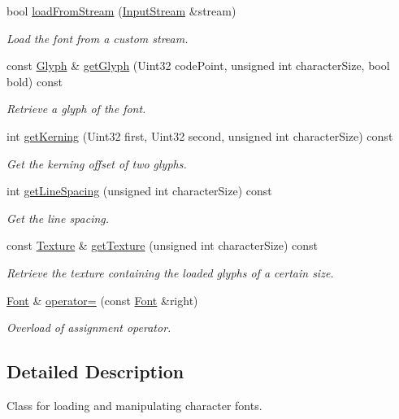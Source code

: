 \begin{DoxyCompactItemize}
bool \hyperlink{classsf_1_1_font_abc3f37a354ce8b9a21f8eb93bd9fdafb}{load\+From\+Stream} (\hyperlink{classsf_1_1_input_stream}{Input\+Stream} \&stream)
\begin{DoxyCompactList}\small\item\em Load the font from a custom stream. \end{DoxyCompactList}\item 
const \hyperlink{classsf_1_1_glyph}{Glyph} \& \hyperlink{classsf_1_1_font_a148eb92890113052f12f8a231ad619b9}{get\+Glyph} (Uint32 code\+Point, unsigned int character\+Size, bool bold) const 
\begin{DoxyCompactList}\small\item\em Retrieve a glyph of the font. \end{DoxyCompactList}\item 
int \hyperlink{classsf_1_1_font_a4093f7d2d195c88ea90b34cf14e003c8}{get\+Kerning} (Uint32 first, Uint32 second, unsigned int character\+Size) const 
\begin{DoxyCompactList}\small\item\em Get the kerning offset of two glyphs. \end{DoxyCompactList}\item 
int \hyperlink{classsf_1_1_font_a05f23b88b13bd094083da5b7efc94371}{get\+Line\+Spacing} (unsigned int character\+Size) const 
\begin{DoxyCompactList}\small\item\em Get the line spacing. \end{DoxyCompactList}\item 
const \hyperlink{classsf_1_1_texture}{Texture} \& \hyperlink{classsf_1_1_font_a887368a4e6a3dfa32dea89d2af315951}{get\+Texture} (unsigned int character\+Size) const 
\begin{DoxyCompactList}\small\item\em Retrieve the texture containing the loaded glyphs of a certain size. \end{DoxyCompactList}\item 
\hyperlink{classsf_1_1_font}{Font} \& \hyperlink{classsf_1_1_font_a232515549846e3172a514d0b47918399}{operator=} (const \hyperlink{classsf_1_1_font}{Font} \&right)
\begin{DoxyCompactList}\small\item\em Overload of assignment operator. \end{DoxyCompactList}\end{DoxyCompactItemize}


\subsection{Detailed Description}
Class for loading and manipulating character fonts. 

